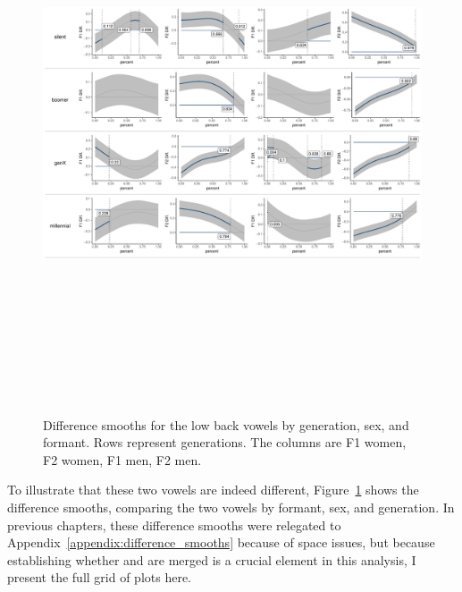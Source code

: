 \begin{figure}[p]
    \centering
    \includegraphics[angle=90, origin=c, height = 6.5in]{Figures/other_figures/low_back_diff_smooths.pdf}
    \caption[Difference smooths for the low back vowels]{Difference smooths for the low back vowels by generation, sex, and formant. Rows represent generations. The columns are F1 women, F2 women, F1 men, F2 men.}
    \label{fig:low_back_difference_smooths}
\end{figure}

To illustrate that these two vowels are indeed different, Figure~\ref{fig:low_back_difference_smooths} shows the difference smooths, comparing the two vowels by formant, sex, and generation. In previous chapters, these difference smooths were relegated to Appendix~\ref{appendix:difference_smooths} because of space issues, but because establishing whether \lot and \thought are merged is a crucial element in this analysis, I present the full grid of plots here.

